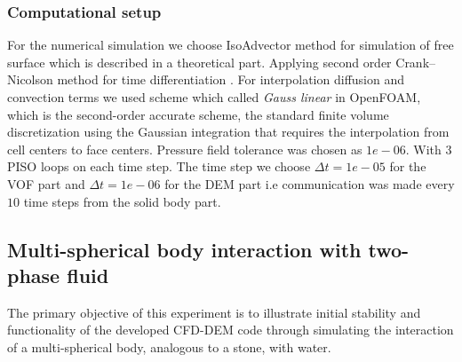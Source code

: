 \subsubsection{Computational setup}

For the numerical simulation we choose IsoAdvector \cite{roenby2019isoadvector} method for simulation of free surface which is described in a theoretical part. Applying second order Crank–Nicolson method for time differentiation . For interpolation  diffusion and convection terms we used scheme which called \textit{Gauss linear} in OpenFOAM, which is the second-order accurate scheme, the standard finite volume discretization using the Gaussian integration that requires the interpolation from cell centers to face centers. Pressure field tolerance was chosen as $1e-06$. With 3 PISO loops on each time step. The time step we choose $\Delta t = 1e-05$ for the VOF part and $\Delta t = 1e-06$ for the DEM part i.e communication was made every $10$ time steps from the solid body part.

\subsection{Multi-spherical body interaction with two-phase fluid}

The primary objective of this experiment is to illustrate initial stability and functionality of the developed CFD-DEM code through simulating the interaction of a multi-spherical body, analogous to a stone, with water.

